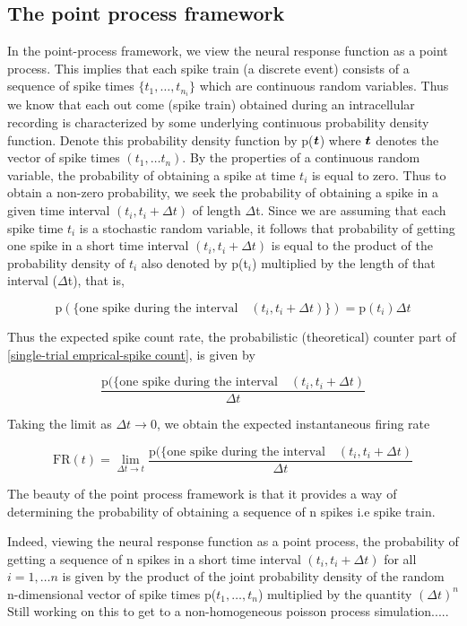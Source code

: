 \subsection{The point process framework}
In the point-process framework, we view the neural response function as a point process. This implies that each spike train (a discrete event) consists of a sequence of spike times $\{t_{1}, \ldots, t_{n_{i}} \}$ which
are continuous random variables. Thus we know that each out come (spike train)
obtained during an intracellular recording is characterized by some underlying continuous probability density function. Denote this probability density function by p($\boldsymbol{t}$) where $\boldsymbol{t}$ denotes the vector of spike times $(t_{1}, \ldots t_{n})$. By the properties of a continuous random variable, the probability of obtaining a spike at time $t_{i}$ is equal to zero. Thus to obtain a non-zero probability, we seek the probability of obtaining a spike in a given time interval $(t_{i}, t_{i}+\Delta t)$ of length $\Delta$t.
Since we are assuming that each spike time $t_{i}$ is a stochastic random variable, it follows that  probability of getting one spike in a short time interval $(t_i, t_i+\Delta t)$ is equal to the product of  the probability density of $t_{i}$ also denoted by p(t$_{i}$) multiplied by the length 
of that interval ($\Delta$t), that is,

\[
\displaystyle \text{p}(\{\text{one spike during the interval} \quad (t_{i}, t_{i}+\Delta t) \}) = \text{p}(t_{i})\Delta t  
\]

\newpage

Thus the expected spike count rate, the probabilistic (theoretical) counter part
of \eqref{single-trial emprical-spike count}, is given by

\begin{equation}\label{expected count rate}
\displaystyle 
\dfrac{\text{p}(\{\text{one spike during the interval} \quad (t_{i}, t_{i}+\Delta t)}{\Delta t} 
\end{equation}

Taking the limit as $\Delta t \rightarrow 0$, we obtain the expected instantaneous  firing rate
 
\begin{equation}\label{expected instant Firerate}
\displaystyle 
\text{FR}(t) =  \lim_{\Delta t \rightarrow t}  \dfrac{\text{p}(\{\text{one spike during the interval} \quad (t_{i}, t_{i}+\Delta t)}{\Delta t} 
\end{equation}


The beauty of the point process framework is that it provides a way of determining the probability of obtaining a sequence of n spikes i.e spike train.

Indeed, viewing the neural response function as a point process, the
probability of getting a sequence of n spikes in a short time interval
$(t_{i}, t_{i}+\Delta t)$ for all $i=1, \ldots n$ is given by the
product of the joint probability density of the random n-dimensional
vector of spike times p($t_{1}, \ldots, t_{n}$) multiplied by the quantity
$(\Delta t)^{n}$\\


Still working on this to get to a non-homogeneous poisson process simulation.....




